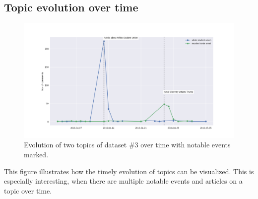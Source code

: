 \subsection{Topic evolution over time}
\label{topic_evo}
\begin{figure}[H]%
\centering
\includegraphics[width=\textwidth]{img/topic_evolution.png}%
\caption{Evolution of two topics of dataset \#3 over time with notable events marked.}
\end{figure}
This figure illustrates how the timely evolution of topics can be visualized. This is especially interesting, when there are multiple notable events and articles on a topic over time.